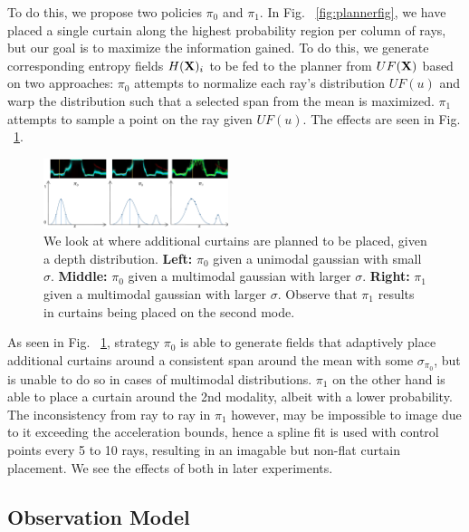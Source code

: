 To do this, we propose two policies $\pi_{0}$ and $\pi_{1}$. In Fig. ~\ref{fig:plannerfig}, we have placed a single curtain along the highest probability region per column of rays, but our goal is to maximize the information gained. To do this, we generate corresponding entropy fields $H(\mathbf{X})_{i}$ to be fed to the planner from $UF(\mathbf{X})$ based on two approaches: $\pi_{0}$ attempts to normalize each ray's distribution $UF(u)$ and warp the distribution such that a selected span from the mean is maximized. $\pi_{1}$ attempts to sample a point on the ray given $UF(u)$. The effects are seen in Fig. ~\ref{fig:m0m1}.

\begin{figure}[h]
   \centering
       \centering
       \includegraphics[width=0.48\textwidth]{figures/fields.pdf}
   \centering
   \caption{We look at where additional curtains are planned to be placed, given a depth distribution. \textbf{Left:} $\pi_{0}$ given a unimodal gaussian with small $\sigma$. \textbf{Middle:} $\pi_{0}$ given a multimodal gaussian with larger $\sigma$. \textbf{Right:} $\pi_{1}$ given a multimodal gaussian with larger $\sigma$. Observe that $\pi_{1}$ results in curtains being placed on the second mode.} 
   \label{fig:m0m1} 
\end{figure}

As seen in Fig. ~\ref{fig:m0m1}, strategy $\pi_{0}$ is able to generate fields that adaptively place additional curtains around a consistent span around the mean with some $\sigma_{\pi_{0}}$, but is unable to do so in cases of multimodal distributions. $\pi_{1}$ on the other hand is able to place a curtain around the 2nd modality, albeit with a lower probability. The inconsistency from ray to ray in $\pi_{1}$ however, may be impossible to image due to it exceeding the acceleration bounds, hence a spline fit is used with control points every 5 to 10 rays, resulting in an imagable but non-flat curtain placement. We see the effects of both in later experiments.

\subsection{Observation Model}


